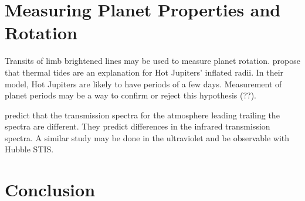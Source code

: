 \documentclass[manuscript]{aastex}
\begin{document}
\section{Measuring Planet Properties and Rotation}
Transits of limb brightened lines may be used to measure planet rotation. \citet{socrates} propose that thermal tides are an explanation for Hot Jupiters' inflated radii. In their model, Hot Jupiters are likely to have periods of a few days. Measurement of planet periods may be a way to confirm or reject this hypothesis (??).

\citet{fortney} predict that the transmission spectra for the atmosphere leading trailing the spectra are different. They predict differences in the infrared transmission spectra. A similar study may be done in the ultraviolet and be observable with Hubble STIS.

\section{Conclusion}


  
\end{document}
